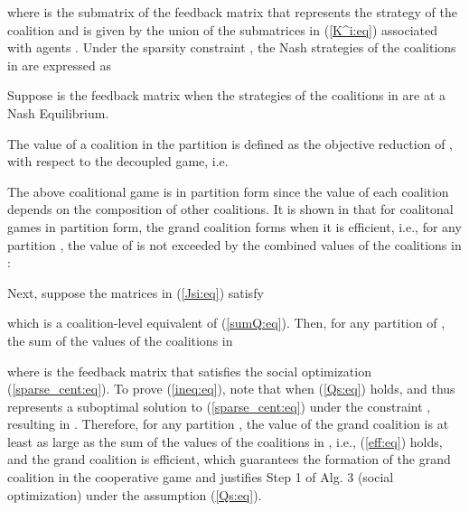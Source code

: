\documentclass[12pt, draftclsnofoot,onecolumn]{IEEEtran}
\begin{document}
\noindent where  is the submatrix of the feedback matrix  that represents the strategy of the coalition  and is given by the union of the submatrices  in (\ref{K^i:eq}) associated with agents . Under the sparsity constraint , the Nash strategies of the coalitions in  are expressed as 


\noindent Suppose  is the feedback matrix when the strategies of the coalitions in  are at a Nash Equilibrium.

The value of a coalition  in the partition  is defined as the objective reduction of , with respect to the decoupled game, i.e.


\noindent The above coalitional game is in partition form \cite{Hafalir2007242} since the value of each coalition depends on the composition of other coalitions. It is shown in \cite{Hafalir2007242} that for coalitonal games in partition form, the grand coalition  forms when it is efficient, i.e., for any partition , the value of  is not exceeded by the combined values of the coalitions in :


\noindent Next, suppose the matrices  in (\ref{Jsi:eq}) satisfy

\noindent which is a coalition-level equivalent of (\ref{sumQ:eq}). Then, for any partition  of , the sum of the values of the coalitions in 


\noindent where  is the feedback matrix that satisfies the social optimization (\ref{sparse_cent:eq}). To prove (\ref{ineq:eq}), note that  when (\ref{Qs:eq}) holds, and thus  represents a suboptimal solution to (\ref{sparse_cent:eq}) under the constraint , resulting in . Therefore, for any partition , the value of the grand coalition is at least as large as the sum of the values of the coalitions in , i.e., (\ref{eff:eq}) holds, and the grand coalition is efficient, which guarantees the formation of the grand coalition in the cooperative game and justifies Step 1 of Alg. 3 (social optimization) under the assumption (\ref{Qs:eq}).

\end{document}
